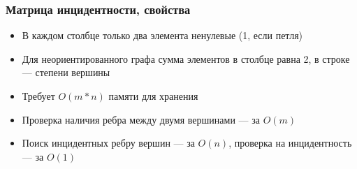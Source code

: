 \documentclass[xetex,mathserif,serif]{beamer}
\begin{document}
    \begin{frame}
        \frametitle{Матрица инцидентности, свойства}
        \begin{itemize}
            \item В каждом столбце только два элемента ненулевые (1, если петля)
            \item Для неориентированного графа сумма элементов в столбце равна 2, в строке --- степени вершины
            \item Требует $O(m * n)$ памяти для хранения
            \item Проверка наличия ребра между двумя вершинами --- за $O(m)$
            \item Поиск инцидентных ребру вершин --- за $O(n)$, проверка на инцидентность --- за $O(1)$
        \end{itemize}
    \end{frame}
\end{document}
